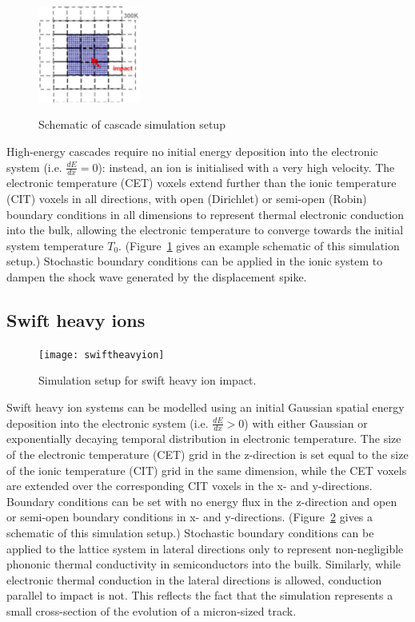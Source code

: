 \begin{figure}[h]
	\centering
	{
		\includegraphics[width=0.3\textwidth]{cascades}
	}
	\caption{Schematic of cascade simulation setup}
	\label{fig:cascades}
\end{figure}
High-energy cascades require no initial energy deposition into the
electronic system (i.e. $\frac{dE}{dx} = 0$): instead, an ion is
initialised with a very high velocity. The electronic temperature
(CET) voxels extend further than the ionic temperature (CIT)
voxels in all directions, with open (Dirichlet) or semi-open
(Robin) boundary conditions in all dimensions to represent thermal
electronic conduction into the bulk, allowing the electronic temperature to
converge towards the initial system temperature $T_0$.
(Figure~\ref{fig:cascades} gives an example schematic of this simulation
setup.) Stochastic boundary conditions can be applied in the ionic system to
dampen the shock wave generated by the displacement spike.

\subsection*{Swift heavy ions}

\begin{figure}[h]
	\centering
	{
		\texttt{[image: swiftheavyion]}
	}
	\caption{Simulation setup for swift heavy ion impact.}
	\label{fig:SHI}
\end{figure}
Swift heavy ion systems can be modelled using an initial Gaussian
spatial energy deposition into the electronic system (i.e.
$\frac{dE}{dx} > 0$) with either Gaussian or exponentially decaying
temporal distribution in electronic temperature. The size of the
electronic temperature (CET) grid in the z-direction is set equal to
the size of the ionic temperature (CIT) grid in the same dimension,
while the CET voxels are extended over the corresponding CIT
voxels in the x- and y-directions. Boundary conditions can be set
with no energy flux in the z-direction and open or semi-open
boundary conditions in x- and y-directions. (Figure~\ref{fig:SHI}
gives a schematic of this simulation setup.) Stochastic boundary
conditions can be applied to the lattice system in lateral directions
only to represent non-negligible phononic thermal conductivity
in semiconductors into the builk. Similarly, while electronic thermal
conduction in the lateral directions is allowed, conduction parallel to
impact is not. This reflects the fact that the simulation represents a
small cross-section of the evolution of a micron-sized track.

